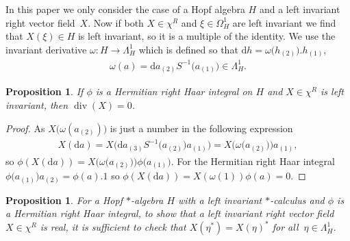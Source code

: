\documentclass[pdftex]{sigma}
\numberwithin{equation}{section}
\newtheorem{Proposition}[Theorem]{Proposition}
 { \theoremstyle{definition}
\newtheorem{Definition}[Theorem]{Definition}
\newtheorem{Note}[Theorem]{Note}
\newtheorem{Example}[Theorem]{Example}
\newtheorem{Remark}[Theorem]{Remark} }
\newcommand{\extd}{\mathrm{d}}
\newcommand{\<}{\langle}
\renewcommand{\>}{\rangle}
\begin{document}
In this paper we only consider the case of a Hopf algebra $ H $ and a left invariant right vector field~$ X $. Now if both $ X \in \chi^{R} $ and $ \xi \in \Omega_{H}^{1} $ are left invariant we find that $ X(\xi) \in H$ is left invariant, so it is a multiple of the identity. We use the invariant derivative $ \omega \colon H\rightarrow \Lambda_{H}^{1} $ which is defined so that $ \extd h=\omega \big(h_{(2)}\big). h_{(1)} $,
\begin{gather}\label{e58}
	\omega (a)=\extd a_{(2)} S^{-1}\big(a_{(1)}\big) \in \Lambda_{H}^{1}.
\end{gather}
\begin{Proposition}\label{prop2}
	If $ \phi $ is a Hermitian right Haar integral on $ H $ and $ X \in \chi^{R} $ is left invariant, then $ \operatorname{div} (X) =0 $.
\end{Proposition}
\begin{proof}
	As $ X \big( \omega (a_{(2)}) \big) $ is just a number in the following expression
	\begin{gather*}
	X(\extd a) =X\big( \extd a_{(3)} S^{-1} \big(a_{(2)}\big) a_{(1)} \big)= X \big( \omega \big(a_{(2)}\big) \big) a_{(1)},
	\end{gather*}
	so $ \phi (	X(\extd a))	=X \big( \omega \big(a_{(2)}\big) \big) \phi \big(a_{(1)} \big) $. For the Hermitian right Haar integral $ \phi \big(a_{(1)}\big) a_{(2)}=\phi (a).1 $
	so $ 	\phi (	X(\extd a))	= X( \omega( 1 ) )\phi (a)=0$.
\end{proof}
\begin{Proposition}\label{P3}
	For a Hopf $ * $-algebra $ H $ with a left invariant $ * $-calculus and $ \phi $ is a Hermitian right Haar integral, to show that a left invariant right vector field $ X \in\chi^{R} $ is real, it is sufficient to check that $ X(\eta^{*})= X(\eta)^{*} $ for all $\ \eta \in \Lambda_{H}^{1} $.
\end{Proposition}
\end{document}
